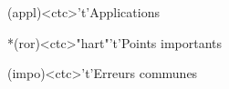 \documentclass[../../main/main.tex]{subfiles}
\begin{document}
\begin{tcn}[sidebyside, fontupper=\small, fontlower=\small]
	\begin{tcn}(appl)<ctc>'t'{Applications}
	\end{tcn}
	\begin{tcn}*(ror)<ctc>"hart"'t'{Points importants}
	\end{tcn}
	\begin{tcn}(impo)<ctc>'t'{Erreurs communes}
	\end{tcn}
\end{tcn}

\vspace*{\fill}
\newpage
\end{document}
